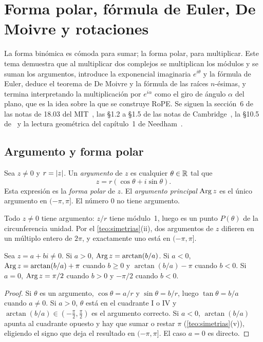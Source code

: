 \chapter{Forma polar, fórmula de Euler, De Moivre y rotaciones}
\label{tema:6}

La forma binómica es cómoda para sumar; la forma polar, para multiplicar. Este tema demuestra que al multiplicar dos complejos se multiplican los módulos y se suman los argumentos, introduce la exponencial imaginaria $e^{i\theta}$ y la fórmula de Euler, deduce el teorema de De Moivre y la fórmula de las raíces $n$-ésimas, y termina interpretando la multiplicación por $e^{i\alpha}$ como el giro de ángulo $\alpha$ del plano, que es la idea sobre la que se construye RoPE. Se siguen la sección~6 de las notas de 18.03 del MIT~\cite{mit1803}, las §1.2 a §1.5 de las notas de Cambridge~\cite{cambvm}, la §10.5 de~\cite{osat} y la lectura geométrica del capítulo~1 de Needham~\cite{needham}.

\section{Argumento y forma polar}

\begin{definicion}\label{def:polar}
Sea $z\ne0$ y $r=\lvert z\rvert$. Un \emph{argumento} de $z$ es cualquier $\theta\in\mathbb{R}$ tal que
\[
z=r(\cos\theta+i\sin\theta).
\]
Esta expresión es la \emph{forma polar} de $z$. El \emph{argumento principal} $\operatorname{Arg} z$ es el único argumento en $(-\pi,\pi]$. El número $0$ no tiene argumento.
\end{definicion}

Todo $z\ne0$ tiene argumento: $z/r$ tiene módulo~1, luego es un punto $P(\theta)$ de la circunferencia unidad. Por el \cref{teo:simetrias}(ii), dos argumentos de $z$ difieren en un múltiplo entero de $2\pi$, y exactamente uno está en $(-\pi,\pi]$.

\begin{proposicion}\label{prop:arg}
Sea $z=a+bi\ne0$. Si $a>0$, $\operatorname{Arg} z=\arctan(b/a)$. Si $a<0$, $\operatorname{Arg} z=\arctan(b/a)+\pi$ cuando $b\ge0$ y $\arctan(b/a)-\pi$ cuando $b<0$. Si $a=0$, $\operatorname{Arg} z=\pi/2$ cuando $b>0$ y $-\pi/2$ cuando $b<0$.
\end{proposicion}

\begin{proof}
Si $\theta$ es un argumento, $\cos\theta=a/r$ y $\sin\theta=b/r$, luego $\tan\theta=b/a$ cuando $a\ne0$. Si $a>0$, $\theta$ está en el cuadrante I o IV y $\arctan(b/a)\in(-\frac{\pi}{2},\frac{\pi}{2})$ es el argumento correcto. Si $a<0$, $\arctan(b/a)$ apunta al cuadrante opuesto y hay que sumar o restar $\pi$ (\cref{teo:simetrias}(v)), eligiendo el signo que deja el resultado en $(-\pi,\pi]$. El caso $a=0$ es directo.
\end{proof}

